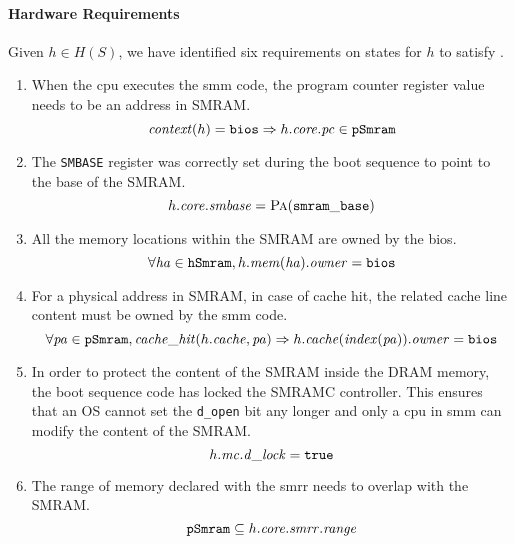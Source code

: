 \paragraph{Hardware Requirements}
%
Given \( h \in H(S) \), we have identified six requirements on states for
\( h \) to satisfy .
%
\begin{enumerate}
\item When the \ac{cpu} executes the \ac{smm} code, the program counter register
  value needs to be an address in SMRAM.
  \[
    \mathit{context}(h) = \mathtt{bios} \Rightarrow h.\mathit{core}.\mathit{pc} \in
    \texttt{pSmram}
  \]
\item The \texttt{SMBASE} register was correctly set during the boot sequence to
  point to the base of the SMRAM.
  \[
    h.\mathit{core}.\mathit{smbase} = \textsc{Pa}(\mathtt{smram\_base})
  \]
\item All the memory locations within the SMRAM are owned by the \ac{bios}.
  \[
    \forall \mathit{ha} \in \texttt{hSmram}, h.\mathit{mem}(\mathit{ha}).\mathit{owner} =
    \mathtt{bios}
  \]
\item For a physical address in SMRAM, in case of cache hit, the related cache
  line content must be owned by the \ac{smm} code.
  \[
    \forall \mathit{pa} \in \texttt{pSmram}, \mathit{cache\_hit}(h.\mathit{cache},
    \mathit{pa}) \Rightarrow h.\mathit{cache}(\mathit{index}(\mathit{pa})).\mathit{owner} =
    \mathtt{bios}
  \]
\item In order to protect the content of the SMRAM inside the DRAM memory, the
  boot sequence code has locked the SMRAMC controller.
  This ensures that an OS cannot set the \texttt{d\_open} bit any longer and
  only a \ac{cpu} in \ac{smm} can modify the content of the SMRAM.
  \[
    h.\mathit{mc}.\mathit{d\_lock} = \mathtt{true}
  \]
\item The range of memory declared with the \ac{smrr} needs to overlap with the
  SMRAM.
  \[
    \texttt{pSmram} \subseteq h.\mathit{core}.\mathit{smrr}.\mathit{range}
  \]
\end{enumerate}


